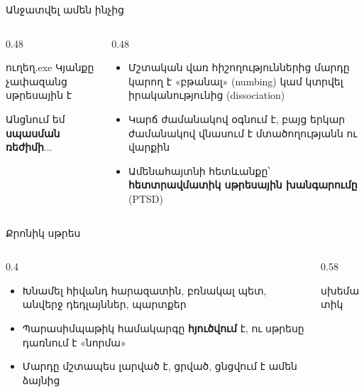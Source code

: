 \begin{frame}{Անջատվել ամեն ինչից}
  \begin{columns}[c]
    \begin{column}{0.48\textwidth}
      \begin{popup}{ուղեղ.exe}
        {\blackfont Կյանքը չափազանց սթրեսային է}\par\smallskip
        Անցնում եմ \textbf{սպասման ռեժիմի}... 
      \end{popup}
    \end{column}
    \begin{column}{0.48\textwidth}
      \begin{itemize}
        \item Մշտական վառ հիշողություններից մարդը կարող է «բթանալ» (numbing) կամ կտրվել իրականությունից (dissociation)
        \item<2-> Կարճ ժամանակով օգնում է, բայց երկար ժամանակով վնասում է մտածողությանն ու վարքին
        \item<3-> Ամենահայտնի հետևանքը՝ \textbf{հետտրավմատիկ սթրեսային խանգարումը} (PTSD)
      \end{itemize}
    \end{column}
  \end{columns}
\end{frame}

\begin{frame}{Քրոնիկ սթրես}
  \begin{columns}[c]
    \begin{column}{0.4\textwidth}
      \begin{itemize}
        \item Խնամել հիվանդ հարազատին, բռնակալ պետ, անվերջ դեդլայններ, պարտքեր
        \item<2-> Պարասիմպաթիկ համակարգը \textbf{հյուծվում} է, ու սթրեսը դառնում է «նորմա»
        \item<3-> Մարդը մշտապես լարված է, ցրված, ցնցվում է ամեն ձայնից
      \end{itemize}
    \end{column}
    \begin{column}{0.58\textwidth}
      \centering
      \par
      {\scriptsize սխեմատիկ}
    \end{column}
  \end{columns}
\end{frame}

